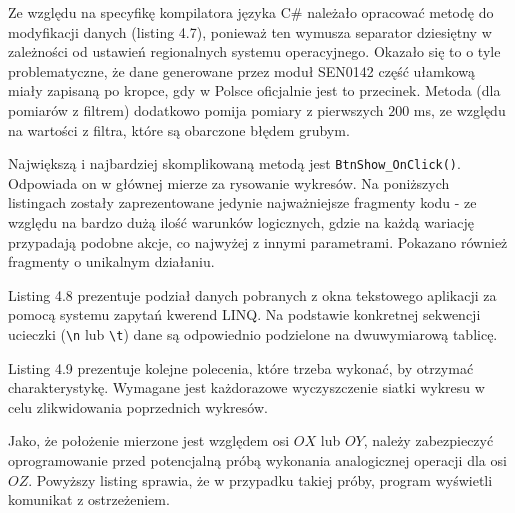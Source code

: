 Ze względu na specyfikę kompilatora języka C\# należało opracować metodę do modyfikacji danych (listing 4.7), ponieważ ten wymusza separator dziesiętny w zależności od ustawień regionalnych systemu operacyjnego. Okazało się to o tyle problematyczne, że dane generowane przez moduł SEN0142 część ułamkową miały zapisaną po kropce, gdy w Polsce oficjalnie jest to przecinek. Metoda (dla pomiarów z filtrem) dodatkowo pomija pomiary z pierwszych $200$ ms, ze względu na wartości z filtra, które są obarczone błędem grubym.

\newpage



Największą i najbardziej skomplikowaną metodą jest \lstinline{BtnShow_OnClick()}. Odpowiada on w głównej mierze za rysowanie wykresów. Na poniższych listingach zostały zaprezentowane jedynie najważniejsze fragmenty kodu - ze względu na bardzo dużą ilość warunków logicznych, gdzie na każdą wariację przypadają podobne akcje, co najwyżej z innymi parametrami. Pokazano również fragmenty o unikalnym działaniu.



Listing 4.8 prezentuje podział danych pobranych z okna tekstowego aplikacji za pomocą systemu zapytań kwerend LINQ. Na podstawie konkretnej sekwencji ucieczki (\lstinline{\n} lub \lstinline{\t}) dane są odpowiednio podzielone na dwuwymiarową tablicę.



Listing 4.9 prezentuje kolejne polecenia, które trzeba wykonać, by otrzymać charakterystykę. Wymagane jest każdorazowe wyczyszczenie siatki wykresu w celu zlikwidowania poprzednich wykresów.



Jako, że położenie mierzone jest względem osi $OX$ lub $OY$, należy zabezpieczyć oprogramowanie przed potencjalną próbą wykonania analogicznej operacji dla osi $OZ$. Powyższy listing sprawia, że w przypadku takiej próby, program wyświetli komunikat z ostrzeżeniem.

